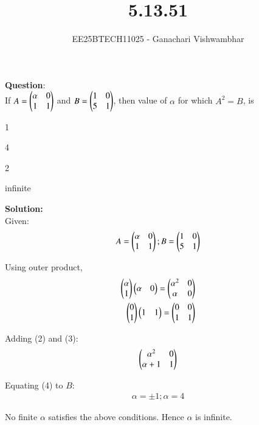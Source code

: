 \documentclass[journal]{IEEEtran}
\begin{document}
\title{5.13.51}
\author{EE25BTECH11025 - Ganachari Vishwambhar}
\maketitle

\textbf{Question}:\\
If $A=\begin{pmatrix}\alpha&0\\1&1\end{pmatrix}$ and $B=\begin{pmatrix}1&0\\5&1\end{pmatrix}$, then value of $\alpha$ for which $A^2=B$, is
\begin{enumerate}
\begin{multicols}{2}
    \item 1
    \item 4
    \item 2
    \item infinite
\end{multicols}
\end{enumerate}
\textbf{Solution: }\\
Given:
\begin{align}
    A = \begin{pmatrix}\alpha&0\\1&1\end{pmatrix};
    B = \begin{pmatrix}1&0\\5&1\end{pmatrix}
\end{align}

Using outer product,
\begin{align}
    \begin{pmatrix}\alpha\\1\end{pmatrix}\begin{pmatrix}\alpha&0\end{pmatrix} = \begin{pmatrix}\alpha^2&0\\\alpha&0\end{pmatrix}\\
    \begin{pmatrix}0\\1\end{pmatrix}\begin{pmatrix}1&1\end{pmatrix} = \begin{pmatrix}0&0\\1&1\end{pmatrix}
\end{align}

Adding (2) and (3):
\begin{align}
    \begin{pmatrix}\alpha^2&0\\\alpha+1&1\end{pmatrix}
\end{align}

Equating (4) to $B$:
\begin{align}
    \alpha = \pm1; \alpha = 4
\end{align}

No finite $\alpha$ satisfies the above conditions. Hence $\alpha$ is infinite.
\end{document}
